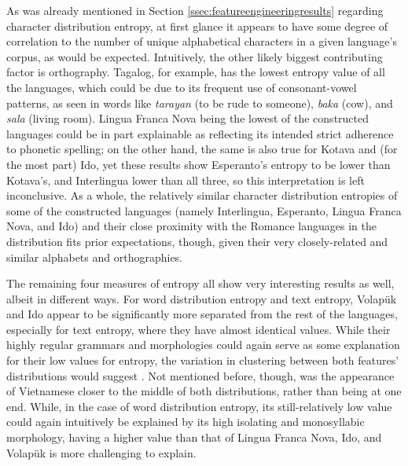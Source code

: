 \documentclass[12pt,a4paper]{article}
\numberwithin{figure}{section}
\numberwithin{table}{section}
\numberwithin{definition}{section}
\begin{document}
As was already mentioned in Section \ref{ssec:featureengineeringresults} regarding character distribution entropy, at first glance it appears to have some degree of correlation to the number of unique alphabetical characters in a given language's corpus, as would be expected. Intuitively, the other likely biggest contributing factor is orthography. Tagalog, for example, has the lowest entropy value of all the languages, which could be due to its frequent use of consonant-vowel patterns, as seen in words like \textit{tarayan} (to be rude to someone), \textit{baka} (cow), and \textit{sala} (living room). Lingua Franca Nova being the lowest of the constructed languages could be in part explainable as reflecting its intended strict adherence to phonetic spelling; on the other hand, the same is also true for Kotava and (for the most part) Ido, yet these results show Esperanto's entropy to be lower than Kotava's, and Interlingua lower than all three, so this interpretation is left inconclusive. As a whole, the relatively similar character distribution entropies of some of the constructed languages (namely Interlingua, Esperanto, Lingua Franca Nova, and Ido) and their close proximity with the Romance languages in the distribution fits prior expectations, though, given their very closely-related and similar alphabets and orthographies. 

The remaining four measures of entropy all show very interesting results as well, albeit in different ways. For word distribution entropy and text entropy, Volapük and Ido appear to be significantly more separated from the rest of the languages, especially for text entropy, where they have almost identical values. While their highly regular grammars and morphologies could again serve as some explanation for their low values for entropy, the variation in clustering between both features' distributions would suggest . Not mentioned before, though, was the appearance of Vietnamese closer to the middle of both distributions, rather than being at one end. While, in the case of word distribution entropy, its still-relatively low value could again intuitively be explained by its high isolating and monosyllabic morphology, having a higher value than that of Lingua Franca Nova, Ido, and Volapük is more challenging to explain. 


\end{document}
